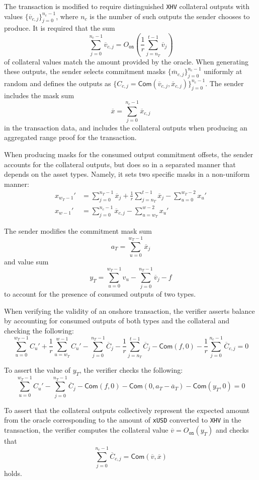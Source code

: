 \documentclass{article}
\newcommand{\oon}{O_{\texttt{on}}}
\newcommand{\com}{\mathsf{Com}}
\begin{document}
The transaction is modified to require distinguished \texttt{XHV} collateral outputs with values $\{\overline{v}_{c,j}\}_{j=0}^{n_c-1}$, where $n_c$ is the number of such outputs the sender chooses to produce.
It is required that the sum
$$\sum_{j=0}^{n_c-1} \overline{v}_{c,j} = \oon\left( \frac{1}{r} \sum_{j=n_T}^{t-1} \overline{v}_j \right)$$
of collateral values match the amount provided by the oracle.
When generating these outputs, the sender selects commitment masks $\{\overline{m}_{c,j}\}_{j=0}^{n_c-1}$ uniformly at random and defines the outputs as $\{C_{c,j} = \com(\overline{v}_{c,j}, \overline{x}_{c,j})\}_{j=0}^{n_c-1}$.
The sender includes the mask sum
$$\overline{x} = \sum_{j=0}^{n_c-1} \overline{x}_{c,j}$$
in the transaction data, and includes the collateral outputs when producing an aggregated range proof for the transaction.

When producing masks for the consumed output commitment offsets, the sender accounts for the collateral outputs, but does so in a separated manner that depends on the asset types.
Namely, it sets two specific masks in a non-uniform manner:
\begin{align*}
x_{w_T-1}' &= \sum_{j=0}^{n_T-1} \overline{x}_j + \frac{1}{r} \sum_{j=n_T}^{t-1} \overline{x}_j - \sum_{u=0}^{w_T-2} x_u' \\
x_{w-1}' &= \sum_{j=0}^{n_c-1} \overline{x}_{c,j} - \sum_{u=w_T}^{w-2} x_u'
\end{align*}

The sender modifies the commitment mask sum
$$a_T = \sum_{u=0}^{w_T-1} \overline{x}_j$$
and value sum
$$y_T = \sum_{u=0}^{w_T-1} v_u - \sum_{j=0}^{n_T-1} \overline{v}_j - f$$
to account for the presence of consumed outputs of two types.

When verifying the validity of an onshore transaction, the verifier asserts balance by accounting for consumed outputs of both types and the collateral and checking the following:
$$\sum_{u=0}^{w_T-1} C_u' + \frac{1}{r} \sum_{u=w_T}^{w-1} C_u' - \sum_{j=0}^{n_T-1} \overline{C}_j - \frac{1}{r} \sum_{j=n_T}^{t-1} \overline{C}_j - \com(f,0) - \frac{1}{r} \sum_{j=0}^{n_c-1} \overline{C}_{c,j} = 0$$

To assert the value of $y_T$, the verifier checks the following:
$$\sum_{u=0}^{w_T-1} C_u' - \sum_{j=0}^{n_T-1} \overline{C}_j - \com(f,0) - \com(0,a_T - \overline{a}_T) - \com(y_T,0) = 0$$

To assert that the collateral outputs collectively represent the expected amount from the oracle corresponding to the amount of \texttt{xUSD} converted to \texttt{XHV} in the transaction, the verifier computes the collateral value $\overline{v} = \oon(y_T)$ and checks that
$$\sum_{j=0}^{n_c-1} \overline{C}_{c,j} = \com(\overline{v}, \overline{x})$$
holds.
\end{document}
